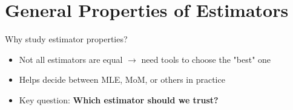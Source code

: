 \section{General Properties of Estimators}





\begin{frame}{Why study estimator properties?}
  \begin{itemize}
  \item Not all estimators are equal \(\to\) need tools to choose the "best" one
    \item Helps decide between MLE, MoM, or others in practice
    \item Key question: \textbf{Which estimator should we trust?}
  \end{itemize}

  \vspace{1em}
\end{frame}

